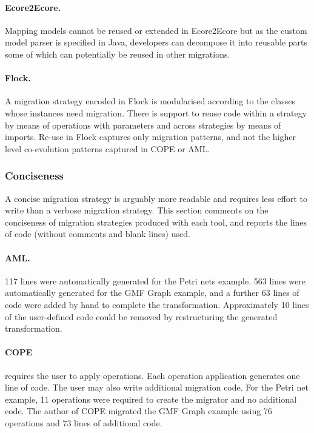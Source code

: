 \paragraph{Ecore2Ecore.} Mapping models cannot be reused or extended in Ecore2Ecore but as the custom model parser is specified in Java, developers can decompose it into reusable parts some of which can potentially be reused in other migrations.

\paragraph{Flock.} A migration strategy encoded in Flock is modularised according to the classes whose instances need migration. There is support to reuse code within a strategy by means of operations with parameters and across strategies by means of imports. Re-use in Flock captures only migration patterns, and not the higher level co-evolution patterns captured in COPE or AML.



\subsubsection{Conciseness}
A concise migration strategy is arguably more readable and requires less effort to write than a verbose migration strategy. This section comments on the conciseness of migration strategies produced with each tool, and reports the lines of code (without comments and blank lines) used. %

\paragraph{AML.} 117 lines were automatically generated for the Petri nets example. 563 lines were automatically generated for the GMF Graph example, and a further 63 lines of code were added by hand to complete the transformation. Approximately 10 lines of the user-defined code could be removed by restructuring the generated transformation. 

\paragraph{COPE} requires the user to apply operations. Each operation application generates one line of code. The user may also write additional migration code. For the Petri net example, 11 operations were required to create the migrator and no additional code. The author of COPE migrated the GMF Graph example using 76 operations and 73 lines of additional code.

